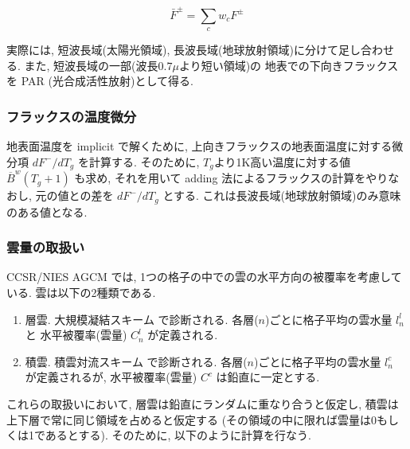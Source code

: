 \begin{equation}
  \bar{F}^\pm = \sum_c w_c F^\pm
\end{equation}

実際には, 短波長域(太陽光領域), 
長波長域(地球放射領域)に分けて足し合わせる.
また, 短波長域の一部(波長$0.7\mu$より短い領域)の
地表での下向きフラックスを PAR (光合成活性放射)として得る.

\subsubsection{フラックスの温度微分}

地表面温度を implicit で解くために,
上向きフラックスの地表面温度に対する微分項
$dF^-/dT_g$ を計算する.
そのために, $T_g$より1K高い温度に対する値 
$\overline{B}^w(T_g+1)$ も求め, それを用いて
adding 法によるフラックスの計算をやりなおし,
元の値との差を $dF^-/dT_g$ とする.
これは長波長域(地球放射領域)のみ意味のある値となる.

\subsubsection{雲量の取扱い}

CCSR/NIES AGCM では,
1つの格子の中での雲の水平方向の被覆率を考慮している.
雲は以下の2種類である.
\begin{enumerate}
\item 層雲. 大規模凝結スキーム  で診断される.
      各層($n$)ごとに格子平均の雲水量 $l^l_n$ と
      水平被覆率(雲量) $C^l_n$ が定義される.      
\item 積雲. 積雲対流スキーム  で診断される.
      各層($n$)ごとに格子平均の雲水量 $l^c_n$ が定義されるが,
      水平被覆率(雲量) $C^c$ は鉛直に一定とする.
\end{enumerate}
これらの取扱いにおいて, 層雲は鉛直にランダムに重なり合うと仮定し,
積雲は上下層で常に同じ領域を占めると仮定する
(その領域の中に限れば雲量は0もしくは1であるとする).
そのために, 以下のように計算を行なう.

